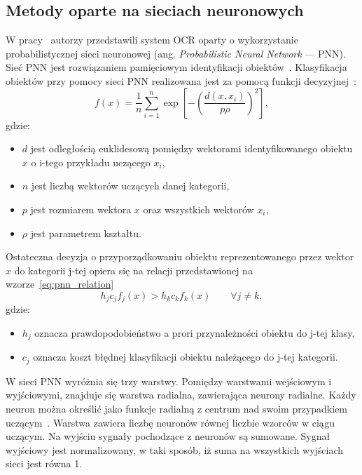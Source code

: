 \subsection{Metody oparte na sieciach neuronowych}
\label{subsec:neural_networks}
W pracy~\cite{1688109} autorzy przedstawili system OCR oparty o wykorzystanie probabilistycznej sieci neuronowej (ang. \textit{Probabilistic Neural Network } --- PNN).
Sieć PNN jest rozwiązaniem pamięciowym identyfikacji obiektów~\cite{Praczyk_2011}.
Klasyfikacja obiektów przy pomocy sieci PNN realizowana jest za pomocą funkcji decyzyjnej~\cite{SPECHT1990109}:
\begin{equation}
    \label{eq:pnn_network}
    f(x)=\dfrac{1}{n}\sum_{i=1}^{n}\exp\left[ -\left( \dfrac{d(x,x_i)}{p\rho} \right)^2 \right],
\end{equation}
gdzie:
\begin{itemize}
    \item $d$ jest odległością euklidesową pomiędzy wektorami identyfikowanego obiektu $x$ o i-tego przykładu uczącego $x_i$,
    \item $n$ jest liczbą wektorów uczących danej kategorii,
    \item $p$ jest rozmiarem wektora $x$ oraz wszystkich wektorów $x_i$,
    \item $\rho$ jest parametrem kształtu.
\end{itemize}
Ostateczna decyzja o przyporządkowaniu obiektu reprezentowanego przez wektor $x$ do kategorii j-tej opiera się na relacji przedstawionej na wzorze~\eqref{eq:pnn_relation}~\cite{Praczyk_2011}
\begin{equation}
    \label{eq:pnn_relation}
    h_j c_j f_j(x) > h_k c_k f_k(x) \qquad \forall j\neq k,
\end{equation}
gdzie:
\begin{itemize}
    \item $h_j$ oznacza prawdopodobieństwo a prori przynależności obiektu do j-tej klasy,
    \item $c_j$ oznacza koszt błędnej klasyfikacji obiektu należącego do j-tej kategorii.
\end{itemize}
W sieci PNN wyróżnia się trzy warstwy.
Pomiędzy warstwami wejściowym i wyjściowymi, znajduje się warstwa radialna, zawierająca neurony radialne.
Każdy neuron można określić jako funkcje radialną z centrum nad swoim przypadkiem uczącym~\cite{Praczyk_2011}.
Warstwa zawiera liczbę neuronów równej liczbie wzorców w ciągu uczącym.
Na wyjściu sygnały pochodzące z neuronów są sumowane.
Sygnał wyjściowy jest normalizowany, w taki sposób, iż suma na wszystkich wyjściach sieci jest równa 1.
